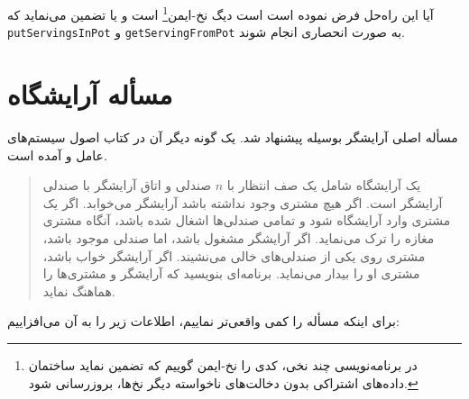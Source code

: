 \documentclass{book}
\newcommand{\clearemptydoublepage}{\newpage\cleardoublepage}
\begin{document}
    آیا این راه‌حل فرض نموده است است دیگ نخ-ایمن\footnote{
    در برنامه‌نویسی چند نخی، کدی را نخ-ایمن گوییم که تضمین نماید ساختمان داده‌های اشتراکی بدون دخالت‌های ناخواسته دیگر نخ‌ها، بروزرسانی شود. 
    }  است و یا تضمین می‌نماید که  {\tt putServingsInPot} و {\tt getServingFromPot} 
    به صورت انحصاری انجام شوند.


\clearemptydoublepage
\section{مسأله آرایشگاه}

    مسأله اصلی آرایشگر بوسیله  پیشنهاد شد. یک گونه دیگر آن در کتاب اصول سیستم‌های عامل  و 
    آمده است. 

\begin {quotation}
    یک آرایشگاه شامل یک صف انتظار با $n$ صندلی و اتاق آرایشگر با صندلی آرایشگر است. اگر هیچ مشتری وجود نداشته باشد 
    آرایشگر می‌خوابد. اگر یک مشتری وارد آرایشگاه شود و تمامی صندلی‌ها اشغال شده باشد، آنگاه مشتری مغازه را ترک می‌نماید. 
    اگر آرایشگر مشغول باشد، اما صندلی موجود باشد، مشتری روی یکی از صندلی‌های خالی می‌نشیند. اگر آرایشگر خواب باشد، مشتری او را بیدار می‌نماید. 
    برنامه‌ای بنویسید که آرایشگر و مشتری‌ها را هماهنگ نماید. 
\end{quotation}

    برای اینکه مسأله را کمی واقعی‌تر نماییم، اطلاعات زیر را به آن می‌افزاییم: 
\end{document}
